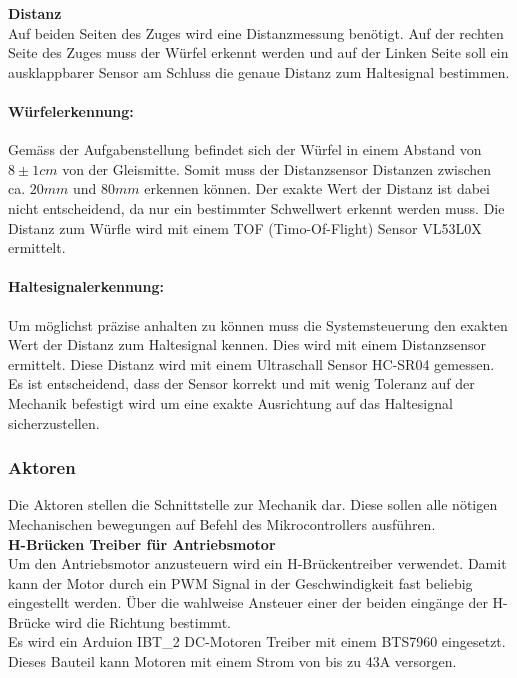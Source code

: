 \documentclass[../../main.tex]{subfiles}
\begin{document}
    \textbf{Distanz}\\
    Auf beiden Seiten des Zuges wird eine Distanzmessung benötigt. Auf der rechten Seite des Zuges muss der Würfel erkennt werden und auf der Linken Seite soll ein ausklappbarer Sensor am Schluss die genaue Distanz zum Haltesignal bestimmen.

    \paragraph{Würfelerkennung:}
    Gemäss der Aufgabenstellung befindet sich der Würfel in einem Abstand von $8\pm1cm$ von der Gleismitte. Somit muss der Distanzsensor Distanzen zwischen ca. $20mm$ und $80mm$ erkennen können. Der exakte Wert der Distanz ist dabei nicht entscheidend, da nur ein bestimmter Schwellwert erkennt werden muss. Die Distanz zum Würfle wird mit einem TOF (Timo-Of-Flight) Sensor VL53L0X ermittelt.

    \paragraph{Haltesignalerkennung:}
    Um möglichst präzise anhalten zu können muss die Systemsteuerung den exakten Wert der Distanz zum Haltesignal kennen. Dies wird mit einem Distanzsensor ermittelt. Diese Distanz wird mit einem Ultraschall Sensor HC-SR04 gemessen. Es ist entscheidend, dass der Sensor korrekt und mit wenig Toleranz auf der Mechanik befestigt wird um eine exakte Ausrichtung auf das Haltesignal sicherzustellen.\\
    
    \subsubsection{Aktoren}
    Die Aktoren stellen die Schnittstelle zur Mechanik dar. Diese sollen alle nötigen Mechanischen bewegungen auf Befehl des Mikrocontrollers ausführen.\\

    \textbf{H-Brücken Treiber für Antriebsmotor}\\
    Um den Antriebsmotor anzusteuern wird ein H-Brückentreiber verwendet. Damit kann der Motor durch ein PWM Signal in der Geschwindigkeit fast beliebig eingestellt werden. Über die wahlweise Ansteuer einer der beiden eingänge der H-Brücke wird die Richtung bestimmt.\\
    Es wird ein Arduion IBT\_2 DC-Motoren Treiber mit einem BTS7960 eingesetzt. Dieses Bauteil kann Motoren mit einem Strom von bis zu 43A versorgen. \\
\end{document}
